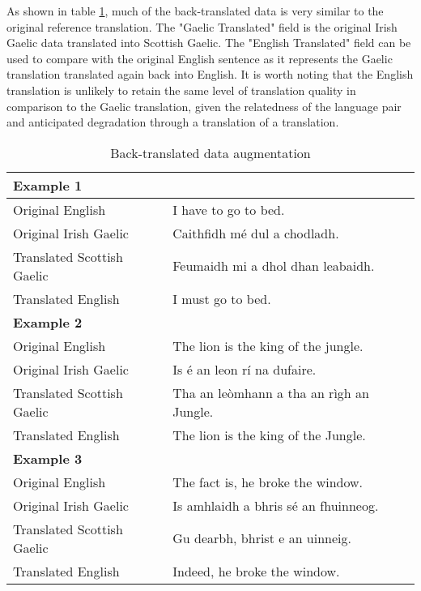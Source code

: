 As shown in table \ref{tab:back_translated-data}, much of the back-translated data is very similar to the original reference translation. The "Gaelic Translated" field is the original Irish Gaelic data translated into Scottish Gaelic. The "English Translated" field can be used to compare with the original English sentence as it represents the Gaelic translation translated again back into English. It is worth noting that the English translation is unlikely to retain the same level of translation quality in comparison to the Gaelic translation, given the relatedness of the language pair and anticipated degradation through a translation of a translation. 

\begin{table}[!ht]
\centering
\renewcommand{\arraystretch}{1.1}
\begin{tabular}{|l|l|}
\hline
\multicolumn{2}{|l|}{\textbf{Example 1}}                              \\ \hline
Original English           & I have to go to bed.                     \\ \hline
Original Irish Gaelic      & Caithfidh mé dul a chodladh.             \\ \hline
Translated Scottish Gaelic & Feumaidh mi a dhol dhan leabaidh.        \\ \hline
Translated English         & I must go to bed.                        \\ \hline
\multicolumn{2}{|l|}{\textbf{Example 2}}                         \\ \hline
Original English           & The lion is the king of the jungle.      \\ \hline
Original Irish Gaelic      & Is é an leon rí na dufaire.              \\ \hline
Translated Scottish Gaelic & Tha an leòmhann a tha an rìgh an Jungle. \\ \hline
Translated English         & The lion is the king of the Jungle.      \\ \hline
\multicolumn{2}{|l|}{\textbf{Example 3}}                             \\ \hline
Original English           & The fact is, he broke the window.        \\ \hline
Original Irish Gaelic      & Is amhlaidh a bhris sé an fhuinneog.     \\ \hline
Translated Scottish Gaelic & Gu dearbh, bhrist e an uinneig.          \\ \hline
Translated English         & Indeed, he broke the window.             \\ \hline
\end{tabular}
\caption{Back-translated data augmentation}
\label{tab:back_translated-data}
\end{table}


